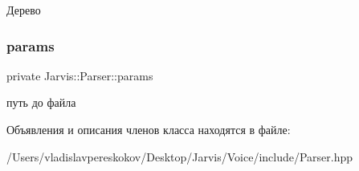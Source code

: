 Дерево \mbox{\label{classJarvis_1_1Parser_a60503f54d37de6bc5eac1e6cb0c79c88}} 
\subsubsection{\texorpdfstring{params}{params}}
{\footnotesize\ttfamily private Jarvis\+::\+Parser\+::params}

путь до файла 

Объявления и описания членов класса находятся в файле\+:\begin{DoxyCompactItemize}
\item 
/\+Users/vladislavpereskokov/\+Desktop/\+Jarvis/\+Voice/include/Parser.\+hpp\end{DoxyCompactItemize}
